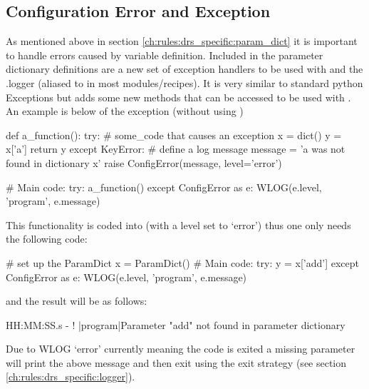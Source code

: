\subsection{Configuration Error and Exception}
\label{ch:rules:drs_specific:config_error}

As mentioned above in section \ref{ch:rules:drs_specific:param_dict} it is important to handle errors caused by variable definition. Included in the parameter dictionary definitions are a new set of exception handlers to be used with \ParamDict and the \spirouLog.logger (aliased to \WLOG in most modules/recipes). It is very similar to standard python Exceptions but adds some new methods that can be accessed to be used with \WLOG. \\

An example is below of the \ConfigError exception (without using \ParamDict)

\begin{pythonbox}
def a_function():
    try:
        # some_code that causes an exception
        x = dict()
        y = x['a']
        return y
    except KeyError:
        # define a log message
        message = 'a was not found in dictionary x'
        raise ConfigError(message, level='error')

# Main code:
try:
    a_function()
except ConfigError as e:
    WLOG(e.level, 'program', e.message)
\end{pythonbox}
\vspace{0.5cm}
\noindent This functionality is coded into \ParamDict (with a \WLOG level set to `error') thus one only needs the following code:
\begin{pythonbox}
# set up the ParamDict
x = ParamDict()
# Main code:
try:
    y = x['add']
except ConfigError as e:
    WLOG(e.level, 'program', e.message)
\end{pythonbox}
\noindent and the result will be as follows:
\begin{cmdboxprint}
HH:MM:SS.s - ! |program|Parameter "add" not found in parameter dictionary
\end{cmdboxprint}
\begin{note}
Due to WLOG `error' currently meaning the code is exited a missing parameter will print the above message and then exit using the  exit strategy (see section \ref{ch:rules:drs_specific:logger}).
\end{note}